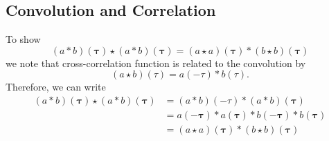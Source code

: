 \documentclass[]{article}
\begin{document}
\subsection*{Convolution and Correlation}
To show  
\begin{equation}
(a \ast b)(\boldsymbol \tau) \star (a \ast b)(\boldsymbol\tau)=(a \star a)(\boldsymbol\tau)\ast(b \star b)(\boldsymbol\tau)
\end{equation}
we note that cross-correlation function is related to the convolution by 
\begin{equation}
 \left(a \star b\right)\left(\tau\right)= a\left(-\tau \right)\ast b\left(\tau\right).
\end{equation}
Therefore, we can write
\begin{align}
 (a \ast b)(\boldsymbol \tau) \star (a \ast b)(\boldsymbol\tau)&=(a \ast b)(\boldsymbol -\tau) \ast (a \ast b)(\boldsymbol\tau) \nonumber \\
&=a(-\boldsymbol\tau)\ast a(\boldsymbol\tau) \ast b(-\boldsymbol\tau)\ast b(\boldsymbol\tau) \nonumber \\
&=(a \star a)(\boldsymbol\tau)\ast(b \star b)(\boldsymbol\tau)
\end{align}


\end{document}
